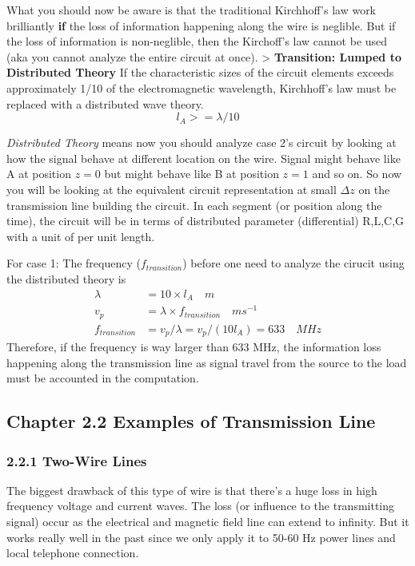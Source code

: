 \documentclass[11pt]{article}
\def\gt{>}
\begin{document}
What you should now be aware is that the traditional Kirchhoff's law
work brilliantly \textbf{if} the loss of information happening along the
wire is neglible. But if the loss of information is non-neglible, then
the Kirchoff's law cannot be used (aka you cannot analyze the entire
circuit at once). \textgreater{} \textbf{Transition: Lumped to
Distributed Theory} If the characteristic sizes of the circuit elements
exceeds approximately 1/10 of the electromagnetic wavelength,
Kirchhoff's law must be replaced with a distributed wave theory.
\[l_A \gt= \lambda/10\]

\emph{Distributed Theory} means now you should analyze case 2's circuit
by looking at how the signal behave at different location on the wire.
Signal might behave like A at position \(z=0\) but might behave like B
at position \(z=1\) and so on. So now you will be looking at the
equivalent circuit representation at small \(\Delta z\) on the
transmission line building the circuit. In each segment (or position
along the time), the circuit will be in terms of distributed parameter
(differential) R,L,C,G with a unit of per unit length.

For case 1: The frequency (\(f_{transition}\)) before one need to
analyze the cirucit using the distributed theory is \[\begin{align}
    \lambda &= 10\times l_A \quad m \\
    v_p &= \lambda \times f_{transition} \quad ms^{-1} \\
    f_{transition} &= v_p / \lambda = v_p / (10l_A) = 633 \quad MHz
   \end{align}\] Therefore, if the frequency is way larger than 633 MHz,
the information loss happening along the transmission line as signal
travel from the source to the load must be accounted in the computation.

    \hypertarget{chapter-2.2-examples-of-transmission-line}{%
\subsection{Chapter 2.2 Examples of Transmission
Line}\label{chapter-2.2-examples-of-transmission-line}}

\hypertarget{two-wire-lines}{%
\subsubsection{2.2.1 Two-Wire Lines}\label{two-wire-lines}}

The biggest drawback of this type of wire is that there's a huge loss in
high frequency voltage and current waves. The loss (or influence to the
transmitting signal) occur as the electrical and magnetic field line can
extend to infinity. But it works really well in the past since we only
apply it to 50-60 Hz power lines and local telephone connection.
\end{document}

